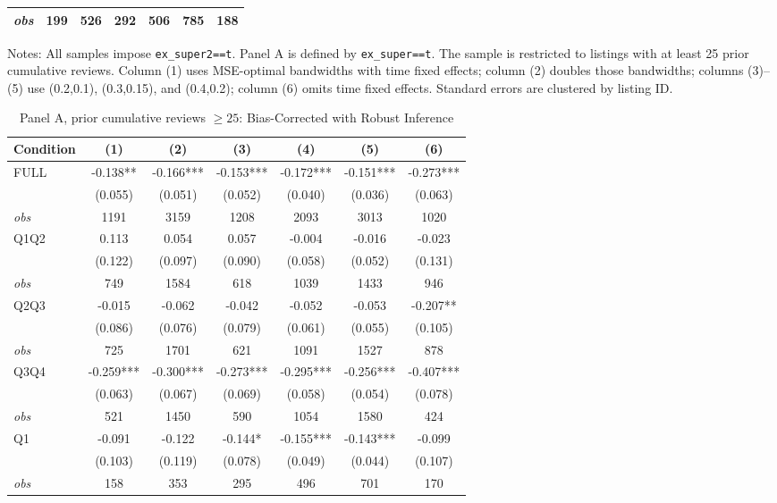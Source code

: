 \begin{table}[!htbp]
\begin{tabular}{lcccccc}
\textit{obs} & 199 & 526 & 292 & 506 & 785 & 188 \\
\bottomrule
\end{tabular}
\begin{minipage}{0.98\textwidth}\footnotesize
Notes: All samples impose \texttt{ex\_super2==t}. Panel A is defined by \texttt{ex\_super==t}. The sample is restricted to listings with at least 25 prior cumulative reviews. Column (1) uses MSE-optimal bandwidths with time fixed effects; column (2) doubles those bandwidths; columns (3)--(5) use (0.2,0.1), (0.3,0.15), and (0.4,0.2); column (6) omits time fixed effects. Standard errors are clustered by listing ID.
\end{minipage}
\end{table}

\begin{table}[!htbp]
\centering
\caption{Panel A, prior cumulative reviews $\geq25$: Bias-Corrected with Robust Inference}
\begin{tabular}{lcccccc}
\toprule
Condition & (1) & (2) & (3) & (4) & (5) & (6) \\
\midrule
FULL & -0.138** & -0.166*** & -0.153*** & -0.172*** & -0.151*** & -0.273*** \\
 & (0.055) & (0.051) & (0.052) & (0.040) & (0.036) & (0.063) \\
\textit{obs} & 1191 & 3159 & 1208 & 2093 & 3013 & 1020 \\
Q1Q2 & 0.113 & 0.054 & 0.057 & -0.004 & -0.016 & -0.023 \\
 & (0.122) & (0.097) & (0.090) & (0.058) & (0.052) & (0.131) \\
\textit{obs} & 749 & 1584 & 618 & 1039 & 1433 & 946 \\
Q2Q3 & -0.015 & -0.062 & -0.042 & -0.052 & -0.053 & -0.207** \\
 & (0.086) & (0.076) & (0.079) & (0.061) & (0.055) & (0.105) \\
\textit{obs} & 725 & 1701 & 621 & 1091 & 1527 & 878 \\
Q3Q4 & -0.259*** & -0.300*** & -0.273*** & -0.295*** & -0.256*** & -0.407*** \\
 & (0.063) & (0.067) & (0.069) & (0.058) & (0.054) & (0.078) \\
\textit{obs} & 521 & 1450 & 590 & 1054 & 1580 & 424 \\
Q1 & -0.091 & -0.122 & -0.144* & -0.155*** & -0.143*** & -0.099 \\
 & (0.103) & (0.119) & (0.078) & (0.049) & (0.044) & (0.107) \\
\textit{obs} & 158 & 353 & 295 & 496 & 701 & 170 \\

\end{tabular}
\end{table}
